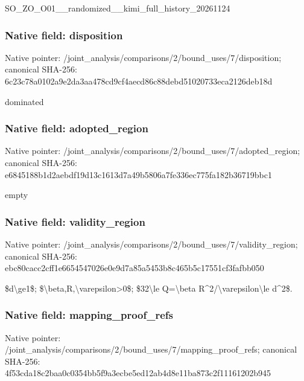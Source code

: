 \documentclass[10pt,a4paper]{article}
\begin{document}
SO\_ZO\_O01\_\_randomized\_\_k\allowbreak{}imi\_full\_history\_2026112\allowbreak{}4


\subsubsection{Native field: disposition}


Native pointer: /joint\_analysis/comparis\allowbreak{}ons/2/bound\_uses/7/dispo\allowbreak{}sition; canonical SHA-256: 6c23c78a0102a9e2da3aa478\allowbreak{}cd9cf4aecd86c88debd51020\allowbreak{}733eca2126deb18d


dominated


\subsubsection{Native field: adopted\_region}


Native pointer: /joint\_analysis/comparis\allowbreak{}ons/2/bound\_uses/7/adopt\allowbreak{}ed\_region; canonical SHA-256: e6845188b1d2aebdf19d13c1\allowbreak{}613d7a49b5806a7fe336ec77\allowbreak{}5fa182b36719bbc1


empty


\subsubsection{Native field: validity\_region}


Native pointer: /joint\_analysis/comparis\allowbreak{}ons/2/bound\_uses/7/valid\allowbreak{}ity\_region; canonical SHA-256: ebc80cacc2cff1e665454702\allowbreak{}6e0e9d7a85a5453b8c465b5c\allowbreak{}17551cf3fafbb050


\$d\textbackslash{}ge1\$; \$\textbackslash{}beta,R,\textbackslash{}varepsilon>0\$; \$32\textbackslash{}le Q=\textbackslash{}beta R\textasciicircum{}2/\textbackslash{}varepsilon\textbackslash{}le d\textasciicircum{}2\$.


\subsubsection{Native field: mapping\_proof\_refs}


Native pointer: /joint\_analysis/comparis\allowbreak{}ons/2/bound\_uses/7/mappi\allowbreak{}ng\_proof\_refs; canonical SHA-256: 4f53cda18c2baa0c0354bb5f\allowbreak{}9a3ecbe5ed12ab4d8e11ba87\allowbreak{}3c2f11161202b945
\end{document}
